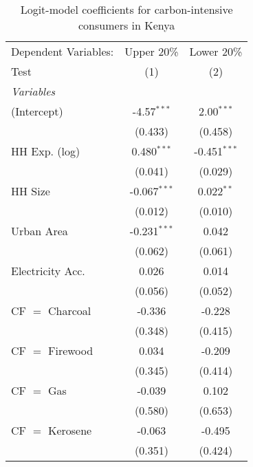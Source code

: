 
\begin{table}[htbp!]
   \centering
   \small
   \begin{adjustbox}{width = 1\textwidth, max height = 0.95\textheight, center}
      \begin{threeparttable}[b]
         \caption{\label{tab:Logit_1_KEN} Logit-model coefficients for carbon-intensive consumers in Kenya}
         \begin{tabular}{lcc}
            \tabularnewline \midrule \midrule
            Dependent Variables: & Upper 20\%     & Lower 20\%\\   
            Test                 & (1)            & (2)\\  
            \midrule
            \emph{Variables}\\
            (Intercept)          & -4.57$^{***}$  & 2.00$^{***}$\\   
                                 & (0.433)        & (0.458)\\   
            HH Exp. (log)        & 0.480$^{***}$  & -0.451$^{***}$\\   
                                 & (0.041)        & (0.029)\\   
            HH Size              & -0.067$^{***}$ & 0.022$^{**}$\\   
                                 & (0.012)        & (0.010)\\   
            Urban Area           & -0.231$^{***}$ & 0.042\\   
                                 & (0.062)        & (0.061)\\   
            Electricity Acc.     & 0.026          & 0.014\\   
                                 & (0.056)        & (0.052)\\   
            CF $=$ Charcoal      & -0.336         & -0.228\\   
                                 & (0.348)        & (0.415)\\   
            CF $=$ Firewood      & 0.034          & -0.209\\   
                                 & (0.345)        & (0.414)\\   
            CF $=$ Gas           & -0.039         & 0.102\\   
                                 & (0.580)        & (0.653)\\   
            CF $=$ Kerosene      & -0.063         & -0.495\\   
                                 & (0.351)        & (0.424)\\   

\end{tabular}
\end{threeparttable}
\end{adjustbox}
\end{table}
